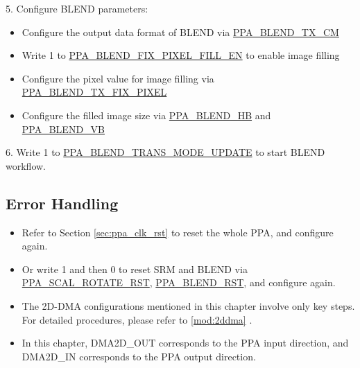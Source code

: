 \documentclass[main\_\_EN.tex]{subfiles}
\begin{document}
5. Configure BLEND parameters:
\begin{itemize}
    \item Configure the output data format of BLEND via \hyperref[fielddesc:PPABLENDTXCM]{PPA\_BLEND\_TX\_CM}
    \item Write 1 to \hyperref[fielddesc:PPABLENDFIXPIXELFILLEN]{PPA\_BLEND\_FIX\_PIXEL\_FILL\_EN} to enable image filling
    \item Configure the pixel value for image filling via \hyperref[fielddesc:PPABLENDTXFIXPIXEL]{PPA\_BLEND\_TX\_FIX\_PIXEL}
    \item Configure the filled image size via \hyperref[fielddesc:PPABLENDHB]{PPA\_BLEND\_HB} and \hyperref[fielddesc:PPABLENDVB]{PPA\_BLEND\_VB}
\end{itemize}

6. Write 1 to \hyperref[fielddesc:PPABLENDTRANSMODEUPDATE]{PPA\_BLEND\_TRANS\_MODE\_UPDATE} to start BLEND workflow.

\subsection{Error Handling}
\begin{itemize}
    \item Refer to Section \ref{sec:ppa_clk_rst} to reset the whole PPA, and configure again.
    \item Or write 1 and then 0 to reset SRM and BLEND via \hyperref[fielddesc:PPASCALROTATERST]{PPA\_SCAL\_ROTATE\_RST}, \hyperref[fielddesc:PPABLENDRST]{PPA\_BLEND\_RST}, and configure again.
\end{itemize}

\begin{tiplisting}
\begin{itemize}
    \vspace{-1.5em}
    \item The 2D-DMA configurations mentioned in this chapter involve only key steps. For detailed procedures, please refer to \ref{mod:2ddma} \textit{}.
    \item In this chapter, DMA2D\_OUT corresponds to the PPA input direction, and DMA2D\_IN corresponds to the PPA output direction.
\end{itemize}
\end{tiplisting}


\newpage
\hypertarget{ppa-reg-summ}{}
\end{document}
